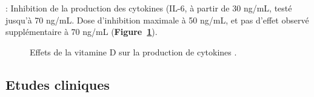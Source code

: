 \documentclass[
  a4paper,
  DIV=11,
  numbers=noendperiod,
  listof=totoc]{scrreprt}
\begin{document}
\textcite{Zhang.2012}: Inhibition de la production des cytokines (IL-6,
à partir de 30 ng/mL, testé jusqu'à 70 ng/mL. Dose d'inhibition maximale
à 50 ng/mL, et pas d'effet observé supplémentaire à 70 ng/mL
(\textbf{Figure~\ref{fig-vd-dose-cytokine}}).

\begin{figure}


\caption{\label{fig-vd-dose-cytokine}Effets de la vitamine D sur la
production de cytokines \autocite{Zhang.2012}.}

\end{figure}%

\subsection{Etudes cliniques}\label{etudes-cliniques}
\end{document}
